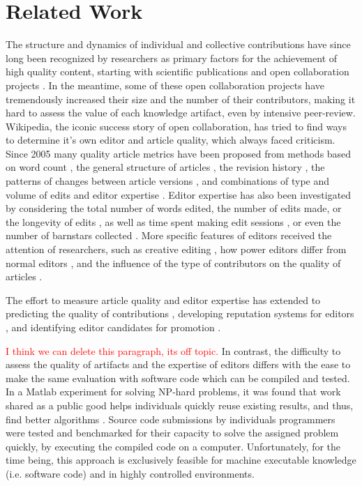 \section{Related Work}
The structure and dynamics of individual and collective contributions have since long been recognized by researchers as primary factors for the achievement of high quality content, starting with scientific publications \cite{newman2001} and open collaboration projects \cite{bryant2005}. In the meantime, some of these open collaboration projects have tremendously increased their size and the number of their contributors, making it hard to assess the value of each knowledge artifact, even by intensive peer-review. Wikipedia, the iconic success story of open collaboration, has tried to find ways to determine it's own editor and article quality, which always faced criticism. Since 2005 many quality article metrics have been proposed from methods based on word count \cite{blumenstock2008sizematters}, the general structure of articles \cite{wang2013tell}, the revision history \cite{hu2007articlequality}, the patterns of changes between article versions \cite{woehner2009}, and combinations of type and volume of edits and editor expertise \cite{kane2011}. Editor expertise has also been investigated by considering the total number of words edited, the number of edits made, or the longevity of edits \cite{adler2008measuringauthor}, as well as time spent making edit sessions \cite{geiger2013}, or even the number of barnstars collected \cite{Kriplean2008}. More specific features of editors received the attention of researchers, such as creative editing \cite{iba2010}, how power editors differ from normal editors \cite{panciera2009}, and the influence of the type of contributors on the quality of articles \cite{stein2007}.

The effort to measure article quality and editor expertise has extended to predicting the quality of contributions \cite{druck2008learning,zeng2006computingtrust}, developing reputation systems for editors \cite{adler2007contentdriven}, and identifying editor candidates for promotion \cite{burke2008taking}.

\textcolor{red}{I think we can delete this paragraph, its off topic.}
In contrast, the difficulty to assess the quality of artifacts and the expertise of editors differs with the ease to make the same evaluation with software code which can be compiled and tested. In a Matlab experiment for solving NP-hard problems, it was found that work shared as a public good helps individuals quickly reuse existing results, and thus, find better algorithms \cite{gulley2010}. Source code submissions by individuals programmers were tested and benchmarked for their capacity to solve the assigned problem quickly, by executing the compiled code on a computer. Unfortunately, for the time being, this approach is exclusively feasible for machine executable knowledge (i.e. software code) and in highly controlled environments.

